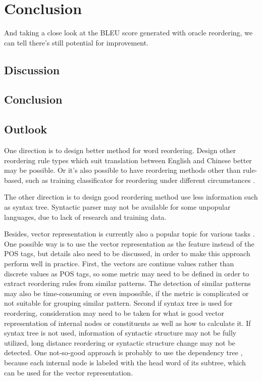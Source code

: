 

\chapter{Conclusion}
\label{ch:Conclusion}
And taking a close look at the BLEU score generated with oracle reordering, we can tell there's still potential for improvement.

\section{Discussion}
\label{ch:Conclusion:sec:Discussion}


\section{Conclusion}
\label{ch:Conclusion:sec:Conclusion}


\section{Outlook}
\label{ch:Conclusion:sec:Outlook}

One direction is to design better method for word reordering. Design other reordering rule types which suit translation between English and Chinese better may be possible. Or it's also possible to have reordering methods other than rule-based, such as training classificator for reordering under different circumstances \citep{google}.

The other direction is to design good reordering method use less information such as syntax tree. Syntactic parser may not be available for some unpopular languages, due to lack of research and training data.

Besides, vector representation is currently also a popular topic for various tasks \citep{oxford, Mikolov}. One possible way is to use the vector representation as the feature instead of the POS tags, but details also need to be discussed, in order to make this approach perform well in practice. First, the vectors are continue values rather than discrete values as POS tags, so some metric may need to be defined in order to extract reordering rules from similar patterns. The detection of similar patterns may also be time-consuming or even impossible, if the metric is complicated or not suitable for grouping similar pattern. Second if syntax tree is used for reordering, consideration may need to be taken for what is good vector representation of internal nodes or constituents as well as how to calculate it. If syntax tree is not used, information of syntactic structure may not be fully utilized, long distance reordering or syntactic structure change may not be detected. One not-so-good approach is probably to use the dependency tree \citep{depend}, because each internal node is labeled with the head word of its subtree, which can be used for the vector representation. 

